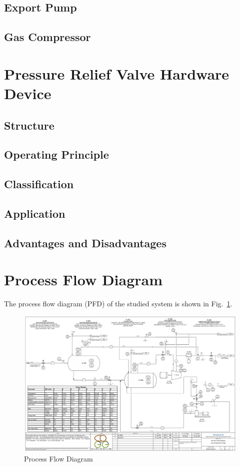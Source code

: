 \documentclass[conference]{IEEEtran}
\begin{document}
\subsection{Export Pump}\label{EP}

\subsection{Gas Compressor}\label{GC}

\section{Pressure Relief Valve Hardware Device}

\subsection{Structure}

\subsection{Operating Principle}

\subsection{Classification}

\subsection{Application}

\subsection{Advantages and Disadvantages}

\section{Process Flow Diagram}
The process flow diagram (PFD) of the studied system is shown in Fig.~\ref{fig:PFD}.

\begin{figure}[htbp]
    \centering
    \includegraphics[width=\textwidth]{process_flow_diagram.png}
    \caption{Process Flow Diagram}
    \label{fig:PFD}
\end{figure}
\end{document}
